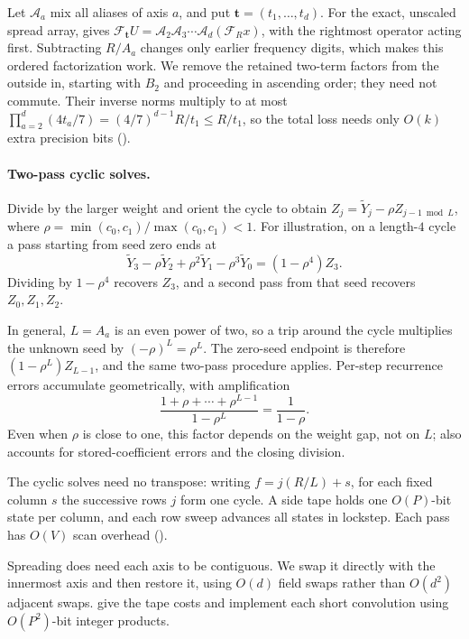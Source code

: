 \documentclass[11pt]{article}
\theoremstyle{definition}
\newcommand{\cA}{\mathcal{A}}
\newcommand{\cF}{\mathcal{F}}
\begin{document}
Let $\cA_a$ mix all aliases of axis $a$, and put $\mathbf t=(t_1,\ldots,t_d)$.
For the exact, unscaled spread array,  gives
$\cF_{\mathbf t}U=\cA_2\cA_3\cdots\cA_d(\cF_Rx)$, with the rightmost operator acting first.
Subtracting $R/A_a$ changes only earlier frequency digits, which makes this ordered factorization work.
We remove the retained two-term factors from the outside in, starting with $B_2$ and proceeding in ascending order; they need not commute.
Their inverse norms multiply to at most
$\prod_{a=2}^d(4t_a/7)=(4/7)^{d-1}R/t_1\le R/t_1$, so the total loss needs only $O(k)$ extra precision bits ().

\paragraph{Two-pass cyclic solves.}
Divide by the larger weight and orient the cycle to obtain
$Z_j=\widetilde Y_j-\rho Z_{j-1\bmod L}$, where
$\rho=\min(c_0,c_1)/\max(c_0,c_1)<1$.
For illustration, on a length-$4$ cycle a pass starting from seed zero ends at
\[
 \widetilde Y_3-\rho\widetilde Y_2+\rho^2\widetilde Y_1-\rho^3\widetilde Y_0
 =(1-\rho^4)Z_3.
\]
Dividing by $1-\rho^4$ recovers $Z_3$, and a second pass from that seed recovers $Z_0,Z_1,Z_2$.

In general, $L=A_a$ is an even power of two, so a trip around the cycle multiplies the unknown seed by $(-\rho)^L=\rho^L$.
The zero-seed endpoint is therefore $(1-\rho^L)Z_{L-1}$, and the same two-pass procedure applies.
Per-step recurrence errors accumulate geometrically, with amplification
\[
 \frac{1+\rho+\cdots+\rho^{L-1}}{1-\rho^L}
 =\frac1{1-\rho}.
\]
Even when $\rho$ is close to one, this factor depends on the weight gap, not on $L$;  also accounts for stored-coefficient errors and the closing division.

The cyclic solves need no transpose: writing $f=j(R/L)+s$, for each fixed column $s$ the successive rows $j$ form one cycle.
A side tape holds one $O(P)$-bit state per column, and each row sweep advances all states in lockstep.
Each pass has $O(V)$ scan overhead ().

Spreading does need each axis to be contiguous.
We swap it directly with the innermost axis and then restore it, using $O(d)$ field swaps rather than $O(d^2)$ adjacent swaps.
 give the tape costs and implement each short convolution using $O(P^2)$-bit integer products.
\end{document}
